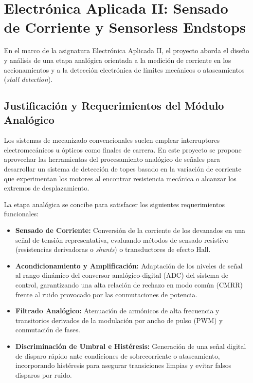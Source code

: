 \chapter{Electrónica Aplicada II: Sensado de Corriente y Sensorless Endstops}
\label{sec:electronica_aplicada_2}

En el marco de la asignatura Electrónica Aplicada II, el proyecto aborda el diseño y análisis de una etapa analógica
orientada a la medición de corriente en los accionamientos y a la detección electrónica de límites mecánicos o
atascamientos (\textit{stall detection}).

\section{Justificación y Requerimientos del Módulo Analógico}
\label{sec:ea2_objetivos}

Los sistemas de mecanizado convencionales suelen emplear interruptores electromecánicos u ópticos como finales de
carrera. En este proyecto se propone aprovechar las herramientas del procesamiento analógico de señales para
desarrollar un sistema de detección de topes basado en la variación de corriente que experimentan los motores al
encontrar resistencia mecánica o alcanzar los extremos de desplazamiento.

La etapa analógica se concibe para satisfacer los siguientes requerimientos funcionales:
\begin{itemize}
  \item \textbf{Sensado de Corriente:} Conversión de la corriente de los devanados en una señal de tensión representativa,
    evaluando métodos de sensado resistivo (resistencias derivadoras o \textit{shunts}) o transductores de efecto Hall.
  \item \textbf{Acondicionamiento y Amplificación:} Adaptación de los niveles de señal al rango dinámico del conversor
    analógico-digital (ADC) del sistema de control, garantizando una alta relación de rechazo en modo común (CMRR)
    frente al ruido provocado por las conmutaciones de potencia.
  \item \textbf{Filtrado Analógico:} Atenuación de armónicos de alta frecuencia y transitorios derivados de la
    modulación por ancho de pulso (PWM) y conmutación de fases.
  \item \textbf{Discriminación de Umbral e Histéresis:} Generación de una señal digital de disparo rápido ante
    condiciones de sobrecorriente o atascamiento, incorporando histéresis para asegurar transiciones limpias y evitar
    falsos disparos por ruido.
\end{itemize}

